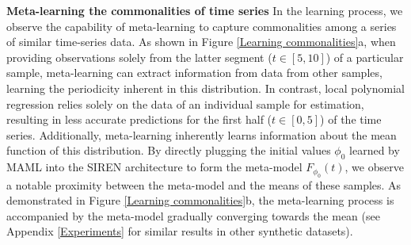 \documentclass{article}
\begin{document}



\textbf{Meta-learning the commonalities of time series}
In the learning process, we observe the capability of meta-learning to capture commonalities among a series of similar time-series data.
As shown in Figure \ref{Learning commonalities}a, when providing observations solely from the latter segment ($t \in [5, 10]$) of a particular sample, 
meta-learning can extract information from data from other samples, learning the periodicity inherent in this distribution. 
In contrast, local polynomial regression relies solely on the data of an individual sample for estimation, 
resulting in less accurate predictions for the first half ($t \in [0, 5]$) of the time series.
Additionally, meta-learning inherently learns information about the mean function of this distribution. 
By directly plugging the initial values $\phi_0$ learned by MAML into the SIREN architecture to form the meta-model $F_{\phi_0}(t)$,
we observe a notable proximity between the meta-model and the means of these samples. 
As demonstrated in Figure \ref{Learning commonalities}b, the meta-learning process is accompanied by the meta-model gradually converging towards the mean (see Appendix \ref{Experiments} for similar results in other synthetic datasets).
\end{document}
